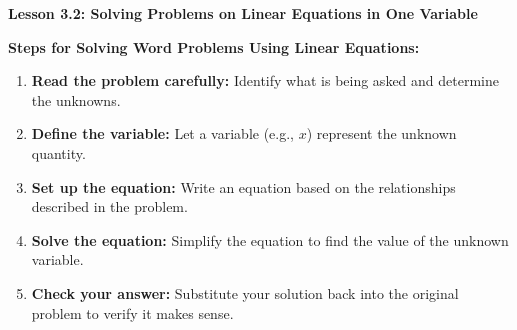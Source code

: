  \begin{center}
\textbf{Lesson 3.2: Solving Problems on Linear Equations in One Variable}
\end{center}

\vspace*{-1ex}

\noindent\textbf{Steps for Solving Word Problems Using Linear Equations:}

\begin{enumerate}
    \item \textbf{Read the problem carefully:} Identify what is being asked and determine the unknowns.
    \item \textbf{Define the variable:} Let a variable (e.g., $x$) represent the unknown quantity.
    \item \textbf{Set up the equation:} Write an equation based on the relationships described in the problem.
    \item \textbf{Solve the equation:} Simplify the equation to find the value of the unknown variable.
    \item \textbf{Check your answer:} Substitute your solution back into the original problem to verify it makes sense.
\end{enumerate}



